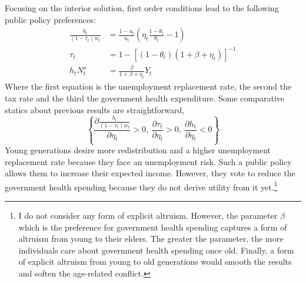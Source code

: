 Focusing on the interior solution, first order conditions lead to the following public policy preferences:
\begin{align}
	\frac{b_t}{(1-\tau_t)w_t} &= \frac{1-u_t}{u_t} \left(\eta_t\frac{1-\theta_t}{\theta_t}- 1\right)
	\label{eq:inverse_replacement_rate}\\
	\tau_t &= 1 - \left[\left(1-\theta_t\right)\left(1+\beta+\eta_t\right)\right]^{-1}
	\label{eq:tax_rate} \\
	h_t N^o_t &= \frac{\beta}{1+\beta+\eta_t}Y_t
	\label{eq:health_expenditure}
\end{align}
Where the first equation is the unemployment replacement rate, the second the tax rate and the third the government health expenditure. Some comparative statics about previous results are straightforward,
\begin{equation*}
	\left\lbrace \frac{\partial \frac{b_t}{(1-\tau_t)w_t}}{\partial \eta_t} > 0, ~ \frac{\partial \tau_t}{\partial \eta_t} > 0, ~\frac{\partial h_t}{\partial \eta_t} < 0\right\rbrace
\end{equation*}
Young generations desire more redistribution and a higher unemployment replacement rate because they face an unemployment risk. Such a public policy allows them to increase their expected income. However, they vote to reduce the government health spending because they do not derive utility from it yet.\footnote{I do not consider any form of explicit altruism. However, the parameter $\beta$ which is the preference for government health spending captures a form of altruism from young to their elders. The greater the parameter, the more individuals care about government health spending once old. Finally, a form of explicit altruism from young to old generations would smooth the results and soften the age-related conflict.}

